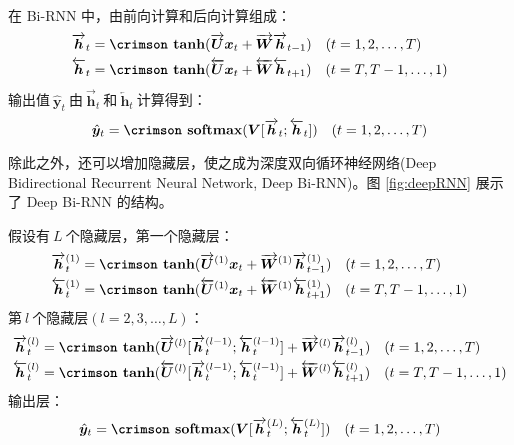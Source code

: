 \documentclass[12pt,a4paper]{article}
\begin{document}
在 {\crimson Bi-RNN} 中，由前向计算和后向计算组成：
\begin{align}
\overrightarrow{\bm{h}}_t &= \textbf{\crimson tanh}(\overrightarrow{\bm{U}}\bm{x}_t + \overrightarrow{\bm{W}}\overrightarrow{\bm{h}}_{t-1})\quad (t = 1,2,\ldots,T) \\
\overleftarrow{\bm{h}}_t &= \textbf{\crimson tanh}(\overleftarrow{\bm{U}}\bm{x}_t + \overleftarrow{\bm{W}}\overleftarrow{\bm{h}}_{t+1})\quad (t = T,T-1,\ldots,1)
\end{align}
输出值$\:\hat{\bm{y}}_t\:$由$\:\overrightarrow{\bm{h}}_t\:$和$\:\overleftarrow{\bm{h}}_t\:$计算得到：
\begin{equation}
\hat{\bm{y}}_t = \textbf{\crimson softmax}(\bm{V}[\overrightarrow{\bm{h}}_t;\overleftarrow{\bm{h}}_t]) \quad (t = 1,2,\ldots,T)
\end{equation}

除此之外，还可以增加隐藏层，使之成为{\hei 深度双向循环神经网络}({\crimson Deep Bidirectional Recurrent Neural Network, Deep Bi-RNN})。图 {\kai \ref{fig:deepRNN}} 展示了 {\crimson Deep Bi-RNN} 的结构。

假设有$\:L\:$个隐藏层，第一个隐藏层：
\begin{align}
\overrightarrow{\bm{h}}_t^{(1)} &= \textbf{\crimson tanh}(\overrightarrow{\bm{U}}^{(1)}\bm{x}_t + \overrightarrow{\bm{W}}^{(1)}\overrightarrow{\bm{h}}_{t-1}^{(1)})\quad (t = 1,2,\ldots,T) \\
\overleftarrow{\bm{h}}_t^{(1)} &= \textbf{\crimson tanh}(\overleftarrow{\bm{U}}^{(1)}\bm{x}_t + \overleftarrow{\bm{W}}^{(1)}\overleftarrow{\bm{h}}_{t+1}^{(1)})\quad (t = T,T-1,\ldots,1)
\end{align}
第$\:l\:$个隐藏层$(l = 2,3,\ldots,L)$：
\begin{align}
\overrightarrow{\bm{h}}_t^{(l)} &= \textbf{\crimson tanh}(\overrightarrow{\bm{U}}^{(l)}[\overrightarrow{\bm{h}}_t^{(l-1)};\overleftarrow{\bm{h}}_t^{(l-1)}] + \overrightarrow{\bm{W}}^{(l)}\overrightarrow{\bm{h}}_{t-1}^{(l)})\quad (t = 1,2,\ldots,T) \\
\overleftarrow{\bm{h}}_t^{(l)} &= \textbf{\crimson tanh}(\overleftarrow{\bm{U}}^{(l)}[\overrightarrow{\bm{h}}_t^{(l-1)};\overleftarrow{\bm{h}}_t^{(l-1)}] + \overleftarrow{\bm{W}}^{(l)}\overleftarrow{\bm{h}}_{t+1}^{(l)})\quad (t = T,T-1,\ldots,1)
\end{align}
输出层：
\begin{equation}
\hat{\bm{y}}_t = \textbf{\crimson softmax}(\bm{V}[\overrightarrow{\bm{h}}_t^{(L)};\overleftarrow{\bm{h}}_t^{(L)}]) \quad (t = 1,2,\ldots,T)
\end{equation}
\end{document}
